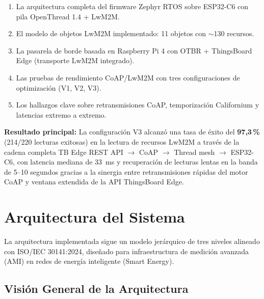 \documentclass[11pt,a4paper]{article}
\begin{document}
\begin{enumerate}[leftmargin=1.5cm]
    \item La arquitectura completa del firmware Zephyr RTOS sobre ESP32-C6 con pila OpenThread 1.4 + LwM2M.
    \item El modelo de objetos LwM2M implementado: 11 objetos con $\sim$130 recursos.
    \item La pasarela de borde basada en Raspberry Pi 4 con OTBR + ThingsBoard Edge (transporte LwM2M integrado).
    \item Las pruebas de rendimiento CoAP/LwM2M con tres configuraciones de optimización (V1, V2, V3).
    \item Los hallazgos clave sobre retransmisiones CoAP, temporización Californium y latencias extremo a extremo.
\end{enumerate}

\noindent\textbf{Resultado principal:} La configuración V3 alcanzó una tasa de éxito del \textbf{97,3\,\%} (214/220 lecturas exitosas) en la lectura de recursos LwM2M a través de la cadena completa TB Edge REST API $\rightarrow$ CoAP $\rightarrow$ Thread mesh $\rightarrow$ ESP32-C6, con latencia mediana de \SI{33}{\milli\second} y recuperación de lecturas lentas en la banda de 5--10 segundos gracias a la sinergia entre retransmisiones rápidas del motor CoAP y ventana extendida de la API ThingsBoard Edge.

\section{Arquitectura del Sistema}

La arquitectura implementada sigue un modelo jerárquico de tres niveles alineado con ISO/IEC 30141:2024, diseñado para infraestructura de medición avanzada (AMI) en redes de energía inteligente (Smart Energy).

\subsection{Visión General de la Arquitectura}
\end{document}
